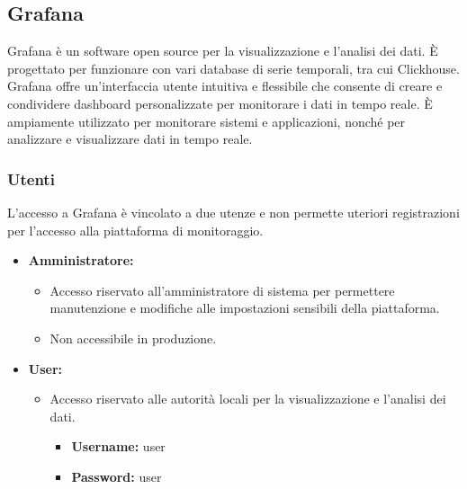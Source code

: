 \subsection{Grafana}
Grafana è un software open source per la visualizzazione e l'analisi dei dati. È progettato per funzionare con vari database di serie temporali, tra cui Clickhouse. Grafana offre un'interfaccia utente intuitiva e flessibile che consente di creare e condividere dashboard personalizzate per monitorare i dati in tempo reale. È ampiamente utilizzato per monitorare sistemi e applicazioni, nonché per analizzare e visualizzare dati in tempo reale.

\subsubsection{Utenti}
L'accesso a Grafana è vincolato a due utenze e non permette uteriori registrazioni per l'accesso alla piattaforma di monitoraggio.
\begin{itemize}
    \item \textbf{Amministratore:} 
    \begin{itemize}
        \item Accesso riservato all'amministratore di sistema per permettere manutenzione e modifiche alle impostazioni sensibili della piattaforma.
        \item Non accessibile in produzione.
    \end{itemize}
    
    \item \textbf{User:} 
    \begin{itemize}
        \item Accesso riservato alle autorità locali per la visualizzazione e l'analisi dei dati.
        \begin{itemize}
            \item \textbf{Username:} user
            \item \textbf{Password:} user
        \end{itemize} 
    \end{itemize}
\end{itemize}


